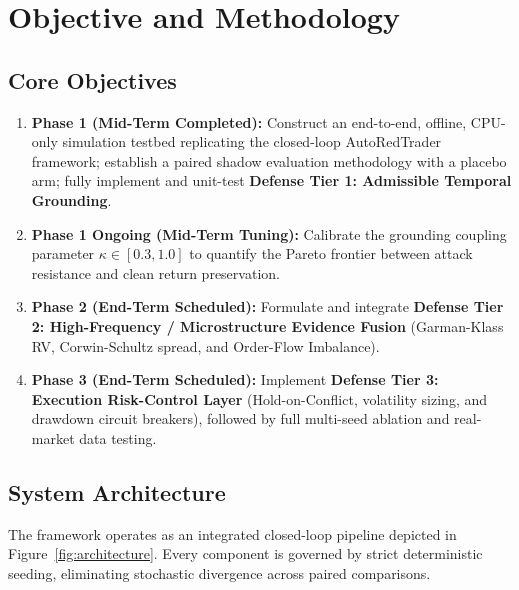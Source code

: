 \documentclass[11pt,a4paper]{article}
\begin{document}
\section{Objective and Methodology}
\label{sec:objective_and_methodology}

\subsection{Core Objectives}
\begin{enumerate}
    \item \textbf{Phase 1 (Mid-Term Completed):} Construct an end-to-end, offline, CPU-only simulation testbed replicating the closed-loop AutoRedTrader framework; establish a paired shadow evaluation methodology with a placebo arm; fully implement and unit-test \textbf{Defense Tier 1: Admissible Temporal Grounding}.
    \item \textbf{Phase 1 Ongoing (Mid-Term Tuning):} Calibrate the grounding coupling parameter $\kappa \in [0.3, 1.0]$ to quantify the Pareto frontier between attack resistance and clean return preservation.
    \item \textbf{Phase 2 (End-Term Scheduled):} Formulate and integrate \textbf{Defense Tier 2: High-Frequency / Microstructure Evidence Fusion} (Garman-Klass RV, Corwin-Schultz spread, and Order-Flow Imbalance).
    \item \textbf{Phase 3 (End-Term Scheduled):} Implement \textbf{Defense Tier 3: Execution Risk-Control Layer} (Hold-on-Conflict, volatility sizing, and drawdown circuit breakers), followed by full multi-seed ablation and real-market data testing.
\end{enumerate}

\subsection{System Architecture}
The framework operates as an integrated closed-loop pipeline depicted in Figure~\ref{fig:architecture}. Every component is governed by strict deterministic seeding, eliminating stochastic divergence across paired comparisons.
\end{document}
